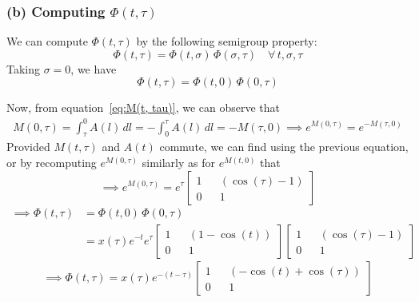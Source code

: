 \subsubsection*{(b) Computing \( \Phi(t, \tau) \)}

We can compute \( \Phi(t, \tau) \) by the following semigroup property:
\begin{equation}\label{eq:semigroup}
    \Phi(t, \tau)
    =
    \Phi(t, \sigma) \, \Phi(\sigma, \tau)
    \quad
    \forall \, t, \sigma, \tau
\end{equation}
Taking \( \sigma = 0 \), we have
\begin{equation*}
    \Phi(t, \tau)
    =
    \Phi(t, 0) \, \Phi(0, \tau)
\end{equation*}

Now, from equation~\eqref{eq:M(t, tau)}, we can observe that
\begin{align*}
    M(0, \tau)
    =
    \int_{\tau}^{0} A(l) \, dl
    =
    -\int_{0}^{\tau} A(l) \, dl
    =
    - M(\tau, 0)
    \implies
    e^{M(0, \tau)}
    =
    e^{-M(\tau, 0)}
\end{align*}
Provided \( M(t, \tau) \) and \( A(t) \) commute, we can find using the previous equation, or by recomputing \( e^{M(0, \tau)} \) similarly as for \( e^{M(t, 0)} \) that
\begin{equation*}
    \implies
    e^{M(0, \tau)}
    =
    e^{\tau}
    \begin{bmatrix}
        1
         &  &
        (\cos(\tau) - 1)
        \\
        0
         &  &
        1
    \end{bmatrix}
\end{equation*}
\begin{align*}
    \implies
    \Phi(t, \tau)
     & =
    \Phi(t, 0) \, \Phi(0, \tau)
    \\ & =
    x(\tau) e^{-t} e^{\tau}
    \begin{bmatrix}
        1
         &  &
        (1 - \cos(t))
        \\
        0
         &  &
        1
    \end{bmatrix}
    \begin{bmatrix}
        1
         &  &
        (\cos(\tau) - 1)
        \\
        0
         &  &
        1
    \end{bmatrix}
\end{align*}
\begin{equation*}
    \implies
    \boxed{
        \Phi(t, \tau)
        =
        x(\tau) e^{-(t - \tau)}
        \begin{bmatrix}
            1
             &  &
            (-\cos(t) + \cos(\tau))
            \\
            0
             &  &
            1
        \end{bmatrix}
    }
\end{equation*}
